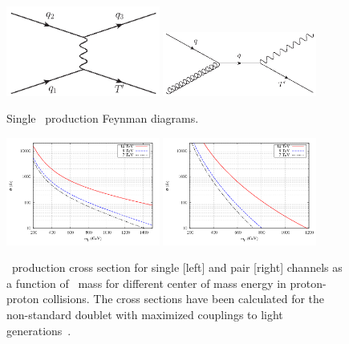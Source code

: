 \begin{figure}[!Hhtbp]
  \begin{center}
    \includegraphics[width=0.45\textwidth]{figs/Tchannel_T_single.jpg}
    \includegraphics[width=0.45\textwidth]{figs/QuarkGluonFusion_SingleT.jpg}
    \caption{Single \Tp~production Feynman diagrams.}
    \label{fig:ProdDiagSingle}
  \end{center}
\end{figure}

\begin{figure}[!Hhtbp]
  \begin{center}
    \includegraphics[width=0.45\textwidth]{figs/pheno_prod_single_tp.png}
    \includegraphics[width=0.45\textwidth]{figs/pheno_prod_pair_tp.png}
    \caption{\Tp~production cross section for single [left] and pair [right] channels as a function of \Tp~mass for different center of mass energy in proton-proton collisions. The cross sections have been calculated for the non-standard doublet with maximized couplings to light generations~\cite{Cacciapaglia:2011fx}.}
    \label{fig:TProdXS}
  \end{center}
\end{figure}

